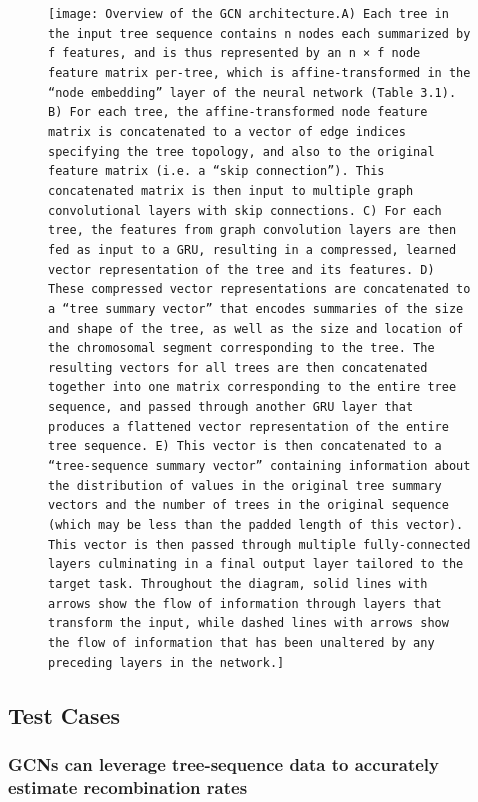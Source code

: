 \begin{figure}
    \centering
    \texttt{[image: Overview of the GCN architecture.A) Each tree in the input tree sequence contains n nodes each summarized by f features, and is thus represented by an n × f node feature matrix per-tree, which is affine-transformed in the “node embedding” layer of the neural network (Table 3.1). B) For each tree, the affine-transformed node feature matrix is concatenated to a vector of edge indices specifying the tree topology, and also to the original feature matrix (i.e. a “skip connection”). This concatenated matrix is then input to multiple graph convolutional layers with skip connections. C) For each tree, the features from graph convolution layers are then fed as input to a GRU, resulting in a compressed, learned vector representation of the tree and its features. D) These compressed vector representations are concatenated to a “tree summary vector” that encodes summaries of the size and shape of the tree, as well as the size and location of the chromosomal segment corresponding to the tree. The resulting vectors for all trees are then concatenated together into one matrix corresponding to the entire tree sequence, and passed through another GRU layer that produces a flattened vector representation of the entire tree sequence. E) This vector is then concatenated to a “tree-sequence summary vector” containing information about the distribution of values in the original tree summary vectors and the number of trees in the original sequence (which may be less than the padded length of this vector). This vector is then passed through multiple fully-connected layers culminating in a final output layer tailored to the target task. Throughout the diagram, solid lines with arrows show the flow of information through layers that transform the input, while dashed lines with arrows show the flow of information that has been unaltered by any preceding layers in the network.]}
    \label{fig:ch2_1}
\end{figure}



\subsection{Test Cases}
\subsubsection{GCNs can leverage tree-sequence data to accurately estimate recombination rates}

